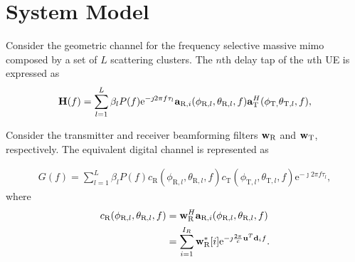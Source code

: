 \documentclass[12pt,a4paper,twoside,english]{article}
\begin{document}
	
\section{System Model}	

\label{sec:CR_bound}

Consider the geometric channel for the frequency selective massive \gls{mimo}
composed by a set of $L$ scattering clusters. The $n$th delay tap of the $u$th
\gls{UE} is expressed as 
\begin{align}
 \mathbf{H}(f) = \sum^{L}_{l=1} \beta_l P(f)\textrm{e}^{-\jmath 2\pi f\tau _l} \mathbf{a} _{\textrm{R},i}(\phi_{\textrm{R},l},\theta_{\textrm{R},l},f)\mathbf{a} ^{H}_{\textrm{T}}(\phi_{\textrm{T},}\theta _{\textrm{T} , l},f),
\end{align}

Consider the transmitter and receiver beamforming filters $\mathbf{w}_{\textrm{R}}$
and $\mathbf{w}_{\textrm{T}}$, respectively. The equivalent digital channel is
represented as

\begin{align}
  G(f) = \sum^{L}_{l=1} \beta_l P(f) c_{\textrm{R}}(\phi_{\textrm{R},l},\theta_{\textrm{R},l},f)c_{\textrm{T}}(\phi_{\textrm{T},l},\theta_{\textrm{T},l},f)\textrm{e}^{-\jmath 2\pi f\tau _l},
\end{align}
where
\begin{align*}
  c_{\textrm{R}}(\phi_{\textrm{R},l},\theta_{\textrm{R},l},f) &= \mathbf{w}^H_{\textrm{R}}\mathbf{a} _{\textrm{R},i}(\phi_{\textrm{R},l},\theta_{\textrm{R},l},f) \\
                                                                & = \sum^{I_R}_{i=1}\mathbf{w}^*_{\textrm{R}}[i]\textrm{e}^{-\jmath\frac{2\pi}{c}\mathbf{u}^T\mathbf{d}_i f }.
\end{align*}

  







 	
\end{document}
